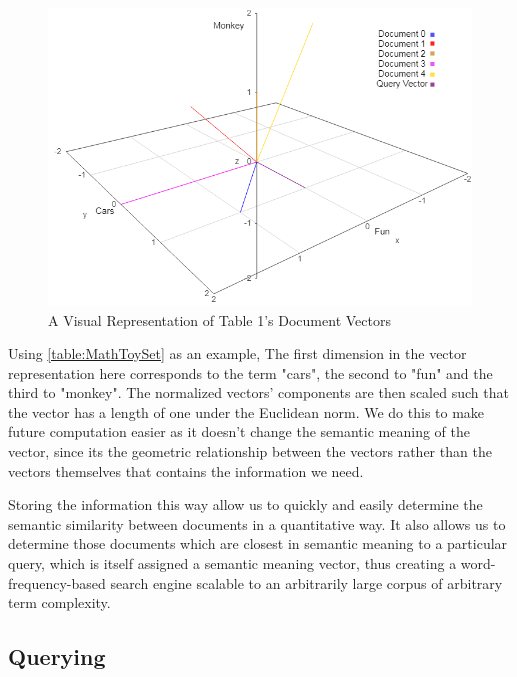 
\begin{figure}[h]
\centering
\includegraphics[width=5in]{imgs/withquery3d.png}
\caption{A Visual Representation of Table 1's Document Vectors}
\label{img:sansquery}
\end{figure}

Using  \autoref{table:MathToySet} as an example, The first dimension in the vector representation here corresponds to the term "cars", the second to "fun" and the third to "monkey". The normalized vectors' components are then scaled such that the vector has a length of one under the Euclidean norm. We do this to make future computation easier as it doesn't change the semantic meaning of the vector, since its the geometric relationship between the vectors rather than the vectors themselves that contains the information we need.


Storing the information this way allow us to quickly and easily determine the semantic similarity between documents in a quantitative way. It also allows us to determine those documents which are closest in semantic meaning to a particular query, which is itself assigned a semantic meaning vector, thus creating a word-frequency-based search engine scalable to an arbitrarily large corpus of arbitrary term complexity.



\subsection{Querying}\label{subsec:querying}

